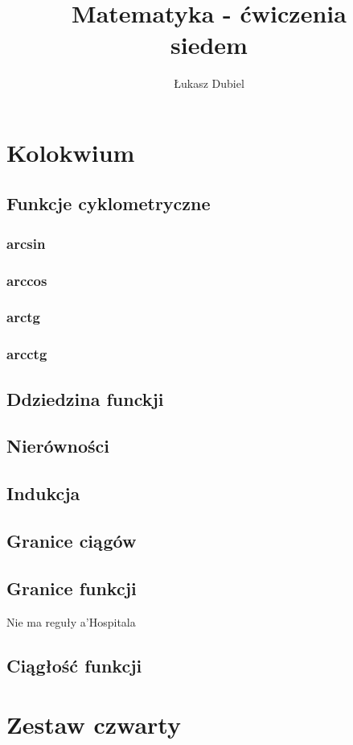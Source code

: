 \documentclass{article}
\title{Matematyka - ćwiczenia \\ siedem}
\author{Łukasz Dubiel}
\begin{document}
\maketitle
\section{Kolokwium}
\subsection{Funkcje cyklometryczne}
\subsubsection{arcsin}
\subsubsection{arccos}
\subsubsection{arctg}
\subsubsection{arcctg}
\subsection{Ddziedzina funckji}
\subsection{Nierówności}
\subsection{Indukcja}

\subsection{Granice ciągów}
\subsection{Granice funkcji}
Nie ma reguły a'Hospitala
\subsection{Ciągłość funkcji}

\section{Zestaw czwarty}
\end{document}

